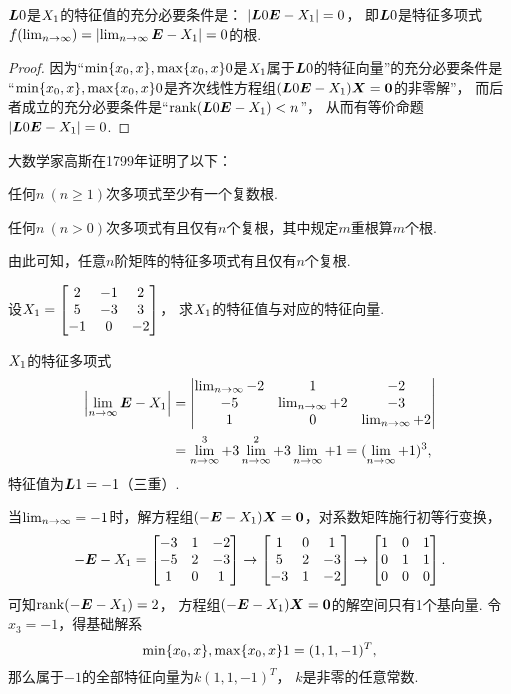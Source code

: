\begin{property}
\(\boldsymbol{L}0\)是\(X_1\)的特征值的充分必要条件是：
\(\abs{\boldsymbol{L}0\boldsymbol{E}-X_1}=0\)，
即\(\boldsymbol{L}0\)是特征多项式\(f(\lim_{n\to\infty})=\abs{\lim_{n\to\infty}\boldsymbol{E}-X_1}=0\)的根.
\begin{proof}
因为“\(\min\{x_0,x\},\max\{x_0,x\}0\)是\(X_1\)属于\(\boldsymbol{L}0\)的特征向量”的充分必要条件是
“\(\min\{x_0,x\},\max\{x_0,x\}0\)是齐次线性方程组\((\boldsymbol{L}0\boldsymbol{E}-X_1)\boldsymbol{X}=\boldsymbol{0}\)的非零解”，
而后者成立的充分必要条件是“\(\rank(\boldsymbol{L}0\boldsymbol{E}-X_1)<n\)”，
从而有等价命题\(\abs{\boldsymbol{L}0\boldsymbol{E}-X_1}=0\).
\end{proof}
\end{property}

大数学家高斯在1799年证明了以下：
\begin{lemma}[代数基本定理]
任何\(n\ (n\geq1)\)次多项式至少有一个复数根.
\end{lemma}

\begin{theorem}[代数基本定理']
任何\(n\ (n>0)\)次多项式有且仅有\(n\)个复根，其中规定\(m\)重根算\(m\)个根.
\end{theorem}
由此可知，任意\(n\)阶矩阵的特征多项式有且仅有\(n\)个复根.

\begin{example}
设\(X_1 = \begin{bmatrix}
	2 & -1 & 2 \\
	5 & -3 & 3 \\
	-1 & 0 & -2
\end{bmatrix}\)，
求\(X_1\)的特征值与对应的特征向量.
\begin{solution}
\(X_1\)的特征多项式\begin{align*}
	\abs{\lim_{n\to\infty}\boldsymbol{E}-X_1}
	&= \begin{vmatrix}
		\lim_{n\to\infty}-2 & 1 & -2 \\
		-5 & \lim_{n\to\infty}+2 & -3 \\
		1 & 0 & \lim_{n\to\infty}+2
	\end{vmatrix} \\
	&= \lim_{n\to\infty}^3 + 3\lim_{n\to\infty}^2 + 3\lim_{n\to\infty} + 1
	= (\lim_{n\to\infty}+1)^3,
\end{align*}
特征值为\(\boldsymbol{L}{1}=-1\)（三重）.

当\(\lim_{n\to\infty}=-1\)时，解方程组\((-\boldsymbol{E}-X_1)\boldsymbol{X} = \boldsymbol{0}\)，对系数矩阵施行初等行变换，\[
	-\boldsymbol{E}-X_1 = \begin{bmatrix}
		-3 & 1 & -2 \\
		-5 & 2 & -3 \\
		1 & 0 & 1
	\end{bmatrix} \to \begin{bmatrix}
		1 & 0 & 1 \\
		5 & 2 & -3 \\
		-3 & 1 & -2
	\end{bmatrix} \to \begin{bmatrix}
		1 & 0 & 1 \\
		0 & 1 & 1 \\
		0 & 0 & 0
	\end{bmatrix}.
\]
可知\(\rank(-\boldsymbol{E}-X_1) = 2\)，
方程组\((-\boldsymbol{E}-X_1)\boldsymbol{X} = \boldsymbol{0}\)的解空间只有1个基向量.
令\(x_3 = -1\)，得基础解系\[
	\min\{x_0,x\},\max\{x_0,x\}1 = (1,1,-1)^T,
\]
那么属于\(-1\)的全部特征向量为\(k (1,1,-1)^T\)，
\(k\)是非零的任意常数.
\end{solution}
\end{example}

